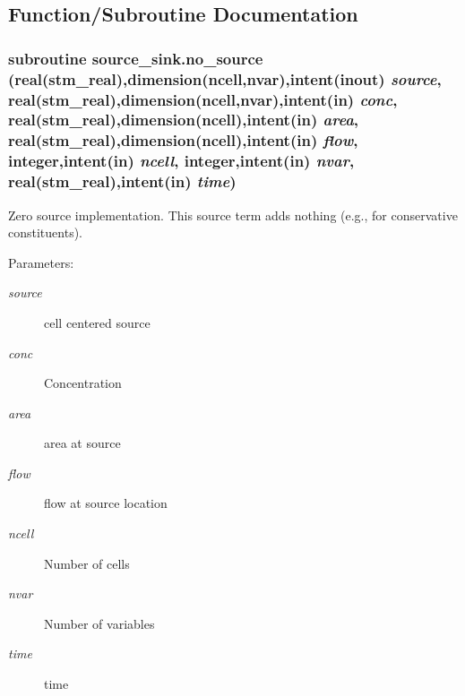 \subsection{Function/Subroutine Documentation}
\hypertarget{a00069_55d2e6a4c1b1ffb79f6bc5b4e39b9c2c}{
\subsubsection[{no\_\-source}]{\setlength{\rightskip}{0pt plus 5cm}subroutine source\_\-sink.no\_\-source (real(stm\_\-real),dimension(ncell,nvar),intent(inout) {\em source}, \/  real(stm\_\-real),dimension(ncell,nvar),intent(in) {\em conc}, \/  real(stm\_\-real),dimension(ncell),intent(in) {\em area}, \/  real(stm\_\-real),dimension(ncell),intent(in) {\em flow}, \/  integer,intent(in) {\em ncell}, \/  integer,intent(in) {\em nvar}, \/  real(stm\_\-real),intent(in) {\em time})}}
\label{a00069_55d2e6a4c1b1ffb79f6bc5b4e39b9c2c}


Zero source implementation. This source term adds nothing (e.g., for conservative constituents). 

\begin{Desc}
\item[Parameters:]
\begin{description}
\item[{\em source}]cell centered source \item[{\em conc}]Concentration\item[{\em area}]area at source \item[{\em flow}]flow at source location\item[{\em ncell}]Number of cells\item[{\em nvar}]Number of variables\item[{\em time}]time \end{description}
\end{Desc}
